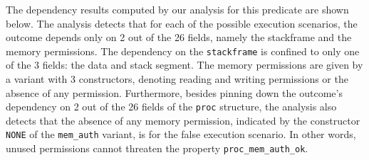 \documentclass[11pt]{article}
\newcommand{\disp}[1]{\lstinline&#1&}
\begin{document}
The dependency results computed by our analysis for this predicate are
shown below. The analysis detects that for each of the possible
execution scenarios, the outcome depends only on 2 out of the 26
fields, namely the stackframe and the memory permissions. The
dependency on the {\disp{stackframe}} is confined to only one of the 3
fields: the data and stack segment. The memory permissions are given
by a variant with 3 constructors, denoting reading and writing
permissions or the absence of any permission. Furthermore, besides
pinning down the outcome's dependency on 2 out of the 26 fields of the
{\disp{proc}} structure, the analysis also detects that the absence
of any memory permission, indicated by the constructor {\disp{NONE}}
of the {\disp{mem_auth}} variant, is \impossible{} for the
\textsf{false} execution scenario. In other words, unused permissions
cannot threaten the property \disp{proc_mem_auth_ok}.
\begin{center}
\end{center}
\end{document}
